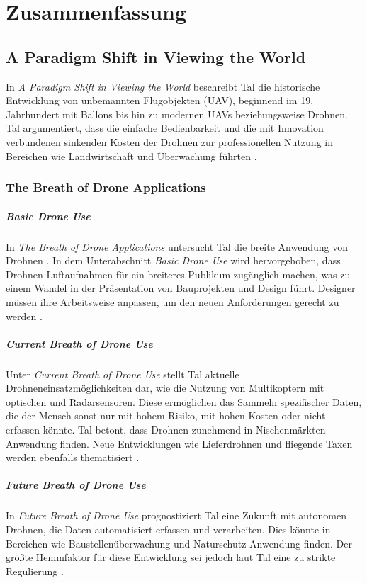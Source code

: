 \chapter{Zusammenfassung}\label{ch:summary}

\section{A Paradigm Shift in Viewing the World}
In \textit{A Paradigm Shift in Viewing the World} beschreibt Tal die historische Entwicklung von unbemannten Flugobjekten (UAV), beginnend im 19. Jahrhundert mit Ballons bis hin zu modernen UAVs beziehungsweise Drohnen.
Tal argumentiert, dass die einfache Bedienbarkeit und die mit Innovation verbundenen sinkenden Kosten der Drohnen zur professionellen Nutzung in Bereichen wie Landwirtschaft und Überwachung führten \cite[p. 11]{Tal2021}.

\subsection{The Breath of Drone Applications}
\paragraph{Basic Drone Use}
In \textit{The Breath of Drone Applications} untersucht Tal die breite Anwendung von Drohnen \cite[p. 12]{Tal2021}.
In dem Unterabschnitt \textit{Basic Drone Use} wird hervorgehoben, dass Drohnen Luftaufnahmen für ein breiteres Publikum zugänglich machen, was zu einem Wandel in der Präsentation von Bauprojekten und Design führt.
Designer müssen ihre Arbeitsweise anpassen, um den neuen Anforderungen gerecht zu werden \cite[p. 12]{Tal2021}.

\paragraph{Current Breath of Drone Use}
Unter \textit{Current Breath of Drone Use} stellt Tal aktuelle Drohneneinsatzmöglichkeiten dar, wie die Nutzung von Multikoptern mit optischen und Radarsensoren.
Diese ermöglichen das Sammeln spezifischer Daten, die der Mensch sonst nur mit hohem Risiko, mit hohen Kosten oder nicht erfassen könnte.
Tal betont, dass Drohnen zunehmend in Nischenmärkten Anwendung finden.
Neue Entwicklungen wie Lieferdrohnen und fliegende Taxen werden ebenfalls thematisiert \cite[pp. 13-15]{Tal2021}.

\paragraph{Future Breath of Drone Use}
In \textit{Future Breath of Drone Use} prognostiziert Tal eine Zukunft mit autonomen Drohnen, die Daten automatisiert erfassen und verarbeiten.
Dies könnte in Bereichen wie Baustellenüberwachung und Naturschutz Anwendung finden.
Der größte Hemmfaktor für diese Entwicklung sei jedoch laut Tal eine zu strikte Regulierung \cite[p. 16]{Tal2021}.

